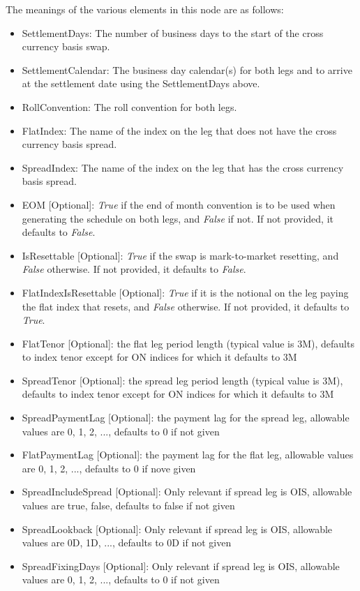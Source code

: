 The meanings of the various elements in this node are as follows:
\begin{itemize}
\item SettlementDays: The number of business days to the start of the cross currency basis swap.
\item SettlementCalendar: The business day calendar(s) for both legs and to arrive at the settlement date using the
SettlementDays above.
\item RollConvention: The roll convention for both legs.
\item FlatIndex: The name of the index on the leg that does not have the cross currency basis spread.
\item SpreadIndex: The name of the index on the leg that has the cross currency basis spread.
\item EOM [Optional]: \emph{True} if the end of month convention is to be used when generating the schedule on both legs, and \emph{False} if not. If not provided, it defaults to \emph{False}.
\item IsResettable [Optional]: \emph{True} if the swap is mark-to-market resetting, and \emph{False} otherwise. If not provided, it defaults to \emph{False}.
\item FlatIndexIsResettable [Optional]: \emph{True} if it is the notional on the leg paying the flat index that resets, and \emph{False} otherwise. If not provided, it defaults to \emph{True}.
\item FlatTenor [Optional]: the flat leg period length (typical value is 3M), defaults to index tenor except for ON indices for which it defaults to 3M
\item SpreadTenor [Optional]: the spread leg period length (typical value is 3M), defaults to index tenor except for ON indices for which it defaults to 3M
\item SpreadPaymentLag [Optional]: the payment lag for the spread leg, allowable values are 0, 1, 2, ..., defaults to 0 if not given
\item FlatPaymentLag [Optional]: the payment lag for the flat leg, allowable values are 0, 1, 2, ..., defaults to 0 if nove given
\item SpreadIncludeSpread [Optional]: Only relevant if spread leg is OIS, allowable values are true, false, defaults to false if not given
\item SpreadLookback [Optional]: Only relevant if spread leg is OIS, allowable values are 0D, 1D, ..., defaults to 0D if not given
\item SpreadFixingDays [Optional]: Only relevant if spread leg is OIS, allowable values are 0, 1, 2, ..., defaults to 0 if not given

\end{itemize}
